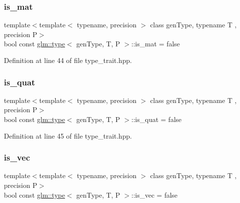 \subsubsection{\texorpdfstring{is\_mat}{is\_mat}}
{\footnotesize\ttfamily template$<$template$<$ typename, precision $>$ class gen\+Type, typename T , precision P$>$ \\
bool const \mbox{\hyperlink{structglm_1_1type}{glm\+::type}}$<$ gen\+Type, T, P $>$\+::is\+\_\+mat = false\hspace{0.3cm}{\ttfamily [static]}}



Definition at line 44 of file type\+\_\+trait.\+hpp.

\mbox{\label{structglm_1_1type_a183d0db2aaef58410b9042663d74e487}} 
\subsubsection{\texorpdfstring{is\_quat}{is\_quat}}
{\footnotesize\ttfamily template$<$template$<$ typename, precision $>$ class gen\+Type, typename T , precision P$>$ \\
bool const \mbox{\hyperlink{structglm_1_1type}{glm\+::type}}$<$ gen\+Type, T, P $>$\+::is\+\_\+quat = false\hspace{0.3cm}{\ttfamily [static]}}



Definition at line 45 of file type\+\_\+trait.\+hpp.

\mbox{\label{structglm_1_1type_a6fdf149b7bcaa9a1d82e29628b7c65ee}} 
\subsubsection{\texorpdfstring{is\_vec}{is\_vec}}
{\footnotesize\ttfamily template$<$template$<$ typename, precision $>$ class gen\+Type, typename T , precision P$>$ \\
bool const \mbox{\hyperlink{structglm_1_1type}{glm\+::type}}$<$ gen\+Type, T, P $>$\+::is\+\_\+vec = false\hspace{0.3cm}{\ttfamily [static]}}



